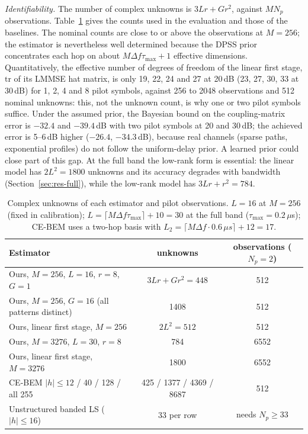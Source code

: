 \emph{Identifiability.} The number of complex unknowns is $3Lr+Gr^2$, against $MN_p$
observations. Table~\ref{tab:unknowns} gives the counts used in the evaluation and those
of the baselines. The nominal counts are close to or above the observations at $M=256$;
the estimator is nevertheless well determined because the DPSS prior concentrates each hop
on about $M\Delta f\tau_{\max}+1$ effective dimensions. Quantitatively, the effective number of degrees of freedom of the
linear first stage, $\mathrm{tr}$ of its LMMSE hat matrix, is only 19, 22, 24 and 27 at 20\,dB (23, 27, 30, 33 at 30\,dB)
for 1, 2, 4 and 8 pilot symbols, against 256 to 2048 observations and 512 nominal unknowns: this, not the unknown
count, is why one or two pilot symbols suffice. Under the assumed prior, the Bayesian bound on the coupling-matrix
error is $-32.4$ and $-39.4$\,dB with two pilot symbols at 20 and 30\,dB; the achieved error is 5--6\,dB higher ($-26.4$,
$-34.3$\,dB), because real channels (sparse paths, exponential profiles) do not follow the uniform-delay prior. A
learned prior could close part of this gap. At the full band the low-rank form
is essential: the linear model has $2L^2=1800$ unknowns and its accuracy degrades with
bandwidth (Section~\ref{sec:res-full}), while the low-rank model has $3Lr+r^2=784$.

\begin{table}[!htbp]\centering
\caption{Complex unknowns of each estimator and pilot observations. $L=16$ at $M=256$ (fixed in calibration); $L=\lceil M\Delta f\tau_{\max}\rceil+10=30$ at the full band ($\tau_{\max}=0.2\,\mu$s); CE-BEM uses a two-hop basis with $L_2=\lceil M\Delta f\cdot0.6\,\mu s\rceil+12=17$.}
\label{tab:unknowns}
\begin{tabular}{lcc}\toprule
Estimator & unknowns & observations ($N_p=2$)\\\midrule
Ours, $M=256$, $L=16$, $r=8$, $G=1$ & $3Lr+Gr^2=448$ & 512 \\
Ours, $M=256$, $G=16$ (all patterns distinct) & 1408 & 512 \\
Ours, linear first stage, $M=256$ & $2L^2=512$ & 512 \\
Ours, $M=3276$, $L=30$, $r=8$ & 784 & 6552 \\
Ours, linear first stage, $M=3276$ & 1800 & 6552 \\
CE-BEM $|h|\le12$ / 40 / 128 / all 255 & 425 / 1377 / 4369 / 8687 & 512 \\
Unstructured banded LS ($|h|\le16$) & $33$ per row & needs $N_p\ge33$\\\bottomrule
\end{tabular}
\end{table}

